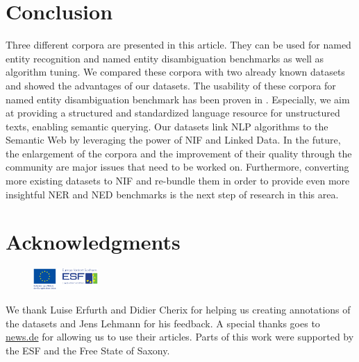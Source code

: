 \documentclass[10pt, a4paper]{article}
\begin{document}
\section{Conclusion}

Three different corpora are presented in this article. They can be used for named entity recognition and named entity disambiguation benchmarks as well as algorithm tuning.
We compared these corpora with two already known datasets and showed the advantages of our datasets.
The usability of these corpora for named entity disambiguation benchmark has been proven in \cite{Usbeck2013,GER+13}.
Especially, we aim at providing a structured and standardized language resource for unstructured texts, enabling semantic querying.
Our datasets link NLP algorithms to the Semantic Web by leveraging the power of NIF and Linked Data.
In the future, the enlargement of the corpora and the improvement of their quality through the community are major issues that need to be worked on. 
Furthermore, converting more existing datasets to NIF and re-bundle them in order to provide even more insightful NER and NED benchmarks is the next step of research in this area.




\section*{Acknowledgments}
\begin{figure}
 \vspace{-5mm}
 \includegraphics[width=0.22\textwidth]{esf.pdf}
\end{figure}
We thank Luise Erfurth and Didier Cherix for helping us creating annotations of the datasets and Jens Lehmann for his feedback. A special thanks goes to \url{news.de} for allowing us to use their articles. Parts of this work were supported by the ESF and the Free State of Saxony.
\end{document}
